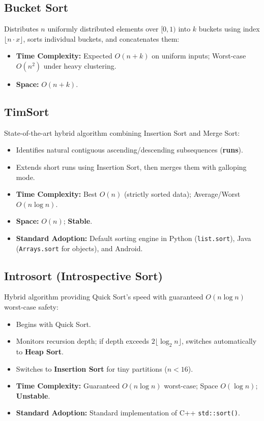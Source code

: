 \subsection{Bucket Sort}
Distributes $n$ uniformly distributed elements over $[0, 1)$ into $k$ buckets using index $\lfloor n \cdot x \rfloor$, sorts individual buckets, and concatenates them:
\begin{itemize}
    \item \textbf{Time Complexity:} Expected $\boxed{O(n + k)}$ on uniform inputs; Worst-case $\boxed{O(n^2)}$ under heavy clustering.
    \item \textbf{Space:} $O(n + k)$.
\end{itemize}

\subsection{TimSort}
State-of-the-art hybrid algorithm combining Insertion Sort and Merge Sort:
\begin{itemize}
    \item Identifies natural contiguous ascending/descending subsequences (\textbf{runs}).
    \item Extends short runs using Insertion Sort, then merges them with galloping mode.
    \item \textbf{Time Complexity:} Best $O(n)$ (strictly sorted data); Average/Worst $\boxed{O(n \log n)}$.
    \item \textbf{Space:} $O(n)$; \textbf{Stable}.
    \item \textbf{Standard Adoption:} Default sorting engine in Python (\texttt{list.sort}), Java (\texttt{Arrays.sort} for objects), and Android.
\end{itemize}

\subsection{Introsort (Introspective Sort)}
Hybrid algorithm providing Quick Sort's speed with guaranteed $O(n \log n)$ worst-case safety:
\begin{itemize}
    \item Begins with Quick Sort.
    \item Monitors recursion depth; if depth exceeds $2 \lfloor \log_2 n \rfloor$, switches automatically to \textbf{Heap Sort}.
    \item Switches to \textbf{Insertion Sort} for tiny partitions ($n < 16$).
    \item \textbf{Time Complexity:} Guaranteed $\boxed{O(n \log n)}$ worst-case; Space $O(\log n)$; \textbf{Unstable}.
    \item \textbf{Standard Adoption:} Standard implementation of C++ \texttt{std::sort()}.
\end{itemize}

